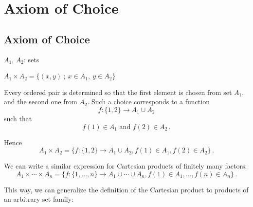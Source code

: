 \documentclass[11pt,paper=b5,footinclude,headinclude]{scrbook} %
\def\sledi {{~\Rightarrow~}}
\def\zgled{\paragraph{Example:}}
\theoremstyle{remark}
\theoremstyle{definition} %
\theoremstyle{theorem} %
\begin{document}
\chapter{Axiom of Choice}
\section{Axiom of Choice}
%
%
%
%
%

$A_1$, $A_2$: sets

$A_1\times A_2 = \{(x,y)~;~x\in A_1,~y\in A_2\}$

Every ordered pair is determined so that the first element is chosen from set $A_1$, and the second one from $A_2$.
Such a choice corresponds to a function
$$f:\{1,2\} \to A_1\cup A_2$$
such that
$$f(1)\in A_1 \textrm{ and }f(2)\in A_2\,.$$

Hence
$$A_1\times A_2 = \{f:\{1,2\} \to A_1\cup A_2,
f(1)\in A_1, f(2)\in A_2\}\,.$$

We can write a similar expression for Cartesian products of finitely many factors:
$$A_1\times \cdots \times A_n= \{f:\{1,\ldots, n\} \to A_1\cup \cdots\cup A_n,
f(1)\in A_1, \ldots, f(n)\in A_n\}\,.$$

\bigskip
This way, we can generalize the definition of the Cartesian product to
products of an arbitrary set family:
\end{document}
